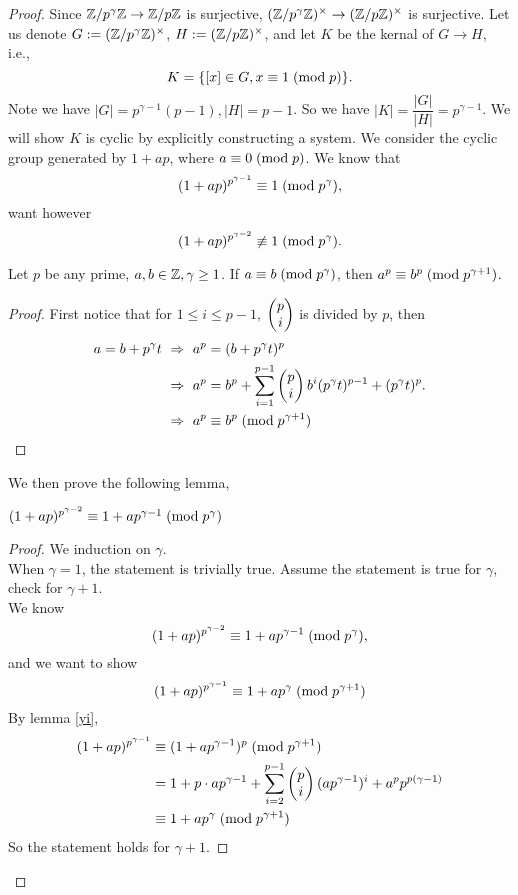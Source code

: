 \documentclass{mynotes}
\begin{document}
\begin{proof}
	Since $\mathbb{Z}/p^{\gamma}\mathbb{Z}\rightarrow\mathbb{Z}/p\mathbb{Z}$ is surjective, $(\mathbb{Z}/p^{\gamma}\mathbb{Z})^{\times}\rightarrow(\mathbb{Z}/p\mathbb{Z})^{\times}$ is surjective. Let us denote $G:=(\mathbb{Z}/p^{\gamma}\mathbb{Z})^{\times}$, $H:=(\mathbb{Z}/p\mathbb{Z})^{\times}$, and let $K$ be the kernal of $G\rightarrow H$, i.e.,
	 $$K=\{[x]\in G, x\equiv 1\;(\mbox{mod}{\;p})\}.$$
	Note we have $|G|=p^{\gamma -1 }(p-1), |H| = p-1$. So we have $|K| = \dfrac{|G|}{|H|} = p^{\gamma -1}$. We will show $K$ is cyclic by explicitly constructing a system. We consider the cyclic group generated by $1+ap$, where $a\equiv 0\;(\mbox{mod}{\;p})$. We know that 
	$$(1+ap)^{p^{\gamma-1}}\equiv 1\;(\mbox{mod}{\;p^{\gamma}}),$$want however 
	$$(1+ap)^{p^{\gamma-2}}\not\equiv 1\;(\mbox{mod}{\;p^{\gamma}}).$$
	\begin{lemma}\label{yi}
		Let $p$ be any prime, $a,b\in\mathbb{Z},\gamma\ge1$. If $a\equiv b\;(\mbox{mod}{\;p^{\gamma}})$, then $a^p\equiv b^p\;(\mbox{mod}{\;p^{\gamma+1}})$.
	\end{lemma}
	\begin{proof}
		First notice that for $1\le i \le p-1$, $\begin{pmatrix}p\\ i \end{pmatrix}$ is divided by $p$, then
		\begin{align*}
			a=b+p^\gamma t\ &\Rightarrow\ a^p=(b+p^\gamma t)^p\\
			&\Rightarrow\ a^p=b^p+\sum\limits_{i=1}^{p-1}\comb{p}{i}b^i (p^\gamma t)^{p-1} + (p^{\gamma}t)^{p}.\\
			&\Rightarrow\ a^p\con{b^p}{p^{\gamma+1}}
		\end{align*}
	\end{proof}
	We then prove the following lemma,
	\begin{lemma}
		$(1+ap)^{p^{\gamma-2}}\equiv 1+ap^{\gamma-1}\;(\mbox{mod}{\;p^{\gamma}})$
	\end{lemma}
	\begin{proof}
		We induction on $\gamma$.\\When $\gamma=1$, the statement is trivially true. Assume the statement is true for $\gamma$, check for $\gamma+1$.\\
		We know $$(1+ap)^{p^{\gamma-2}}\equiv 1+ap^{\gamma -1}\;(\mbox{mod}{\;p^\gamma}),$$and we want to show $$(1+ap)^{p^{\gamma-1}}\equiv 1+ap^{\gamma}\;(\mbox{mod}{\;p^{\gamma+1}})$$By lemma \ref{yi}, \begin{align*}(1+ap)^{p^{\gamma-1}}&\equiv (1+ap^{\gamma-1})^p\;(\mbox{mod}{\;p^{\gamma+1}})\\
		&= 1+ p\cdot ap^{\gamma-1}+\sum\limits_{i=2}^{p-1}\begin{pmatrix}p\\ i \end{pmatrix}(ap^{\gamma-1})^i+a^pp^{p(\gamma-1)}\\
		&\equiv 1+ap^{\gamma}\;(\mbox{mod}{\;p^{\gamma+1}})
		\end{align*}
		So the statement holds for $\gamma+1$.
	\end{proof}
\end{proof}
\end{document}
